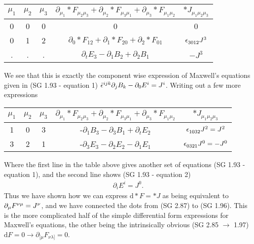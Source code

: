 \begin{center}
	\begin{tabular}{| c | c | c | c | c |} 
		\hline
		$\mu_1$ & $\mu_2$ & $\mu_3$ & $\partial_{\mu_1} \ast F_{\mu_2\mu_3} + \partial_{\mu_2} \ast F_{\mu_3\mu_1} + \partial_{\mu_3} \ast F_{\mu_1\mu_2}$ & $\ast J_{\mu_1 \mu_2 \mu_3}$ \\
		\hline
		
		\rule{0pt}{4ex}0 & 0 & 0 & 0 & 0 \\ 
		0 & 1 & 2 & $\partial_{0} \ast F_{12} + \partial_{1} \ast F_{20} + \partial_{2} \ast F_{01}$ & $\epsilon\indices{_{{3}{0}{1}{2}}}J^3$\\
		. & . & . & $\partial_{t} E_3 - \partial_{1} B_2 + \partial_{2} B_1$ & $-J^3$ \\
		\hline
	\end{tabular}
\end{center}
%
We see that this is exactly the component wise expression of Maxwell's equations given in (SG 1.93 - equation 1) $\tilde{\epsilon}\indices{^{ijk}}\partial_j B_k - \partial_0 E^i = J^i$. Writing out a few more expressions 
%
\begin{center}
	\begin{tabular}{| c | c | c | c | c |} 
		\hline
		$\mu_1$ & $\mu_2$ & $\mu_3$ & $\partial_{\mu_1} \ast F_{\mu_2\mu_3} + \partial_{\mu_2} \ast F_{\mu_3\mu_1} + \partial_{\mu_3} \ast F_{\mu_1\mu_2}$ & $\ast J_{\mu_1 \mu_2 \mu_3}$ \\
		\hline
		
		\rule{0pt}{4ex}1 & 0 & 3 &  -$\partial_{1} B_3 - \partial_{3} B_1 + \partial_{t} E_2$ & $\epsilon\indices{_{{1}{0}{3}{2}}}J^2 = J^2$\\
		3 & 2 & 1 &  -$\partial_{3} E_3 - \partial_{2} E_2 - \partial_{1} E_1$ & $\epsilon\indices{_{{0}{3}{2}{1}}}J^0 = -J^0$\\
		\hline
	\end{tabular}
\end{center}
%
Where the first line in the table above gives another set of equations (SG 1.93 - equation 1), and the second line shows (SG 1.93 - equation 2) 
%
\begin{align} \label{gauss_step_1}
	\partial_i E^i = J^0.
\end{align}
%
Thus we have shown how we can express $ \textrm{d} \ast F = \ast J $ as being equivalent to $\partial_\mu F\indices{^{\nu\mu}} = J^\nu$, and we have connected the dots from (SG 2.87) to (SG 1.96). This is the more complicated half of the simple differential form expressions for Maxwell's equations, the other being the intrinsically obvious (SG 2.85 $\rightarrow$ 1.97) $ \textrm{d} F = 0 \rightarrow \partial_{[\mu}F_{\nu\lambda]} = 0$. 

